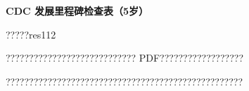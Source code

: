 \documentclass[11pt]{article}
\begin{document}
{\color[HTML]{0A84FF}\LARGE\bfseries CDC 发展里程碑检查表（5岁）\par}
{\color[HTML]{667085}\small ?????res112\par}
\vspace{1em}
???????????????????????????? PDF??????????????????

???????????????????????????????????????????????????
\end{document}
